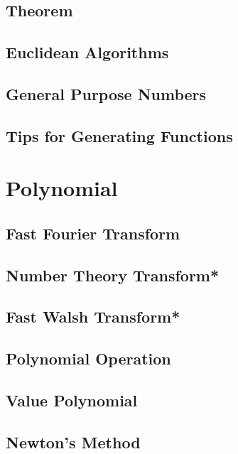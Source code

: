 \subsection{Theorem}

\subsection{Euclidean Algorithms}

\subsection{General Purpose Numbers}

\subsection{Tips for Generating Functions}


\section{Polynomial}
\subsection{Fast Fourier Transform}

\subsection{Number Theory Transform*} %

\subsection{Fast Walsh Transform*} %

\subsection{Polynomial Operation}

\subsection{Value Polynomial}

\subsection{Newton's Method}


